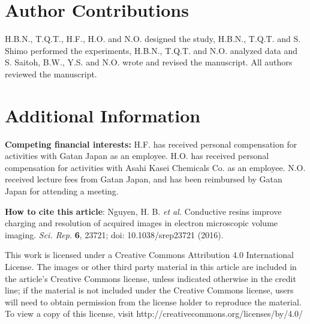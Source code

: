 \documentclass{article}
\begin{document}
\section*{Author Contributions}
H.B.N., T.Q.T., H.F., H.O. and N.O. designed the study, H.B.N., T.Q.T. and S. Shimo performed the experiments, H.B.N., T.Q.T. and N.O. analyzed data and S. Saitoh, B.W., Y.S. and N.O. wrote and revised the manuscript. All authors reviewed the manuscript.

\section*{Additional Information}
\noindent\textbf{Competing financial interests:} H.F. has received personal compensation for activities with Gatan Japan as an employee. H.O. has received personal compensation for activities with Asahi Kasei Chemicals Co. as an employee. N.O. received lecture fees from Gatan Japan, and has been reimbursed by Gatan Japan for attending a meeting.

\noindent\textbf{How to cite this article}: Nguyen, H. B. \emph{et al.} Conductive resins improve charging and resolution of acquired images in electron microscopic volume imaging. \emph{Sci. Rep.} \textbf{6}, 23721; doi: 10.1038/srep23721 (2016).

\noindent This work is licensed under a Creative Commons Attribution 4.0 International License. The images or other third party material in this article are included in the article’s Creative Commons license, unless indicated otherwise in the credit line; if the material is not included under the Creative Commons license, users will need to obtain permission from the license holder to reproduce the material. To view a copy of this license, visit http://creativecommons.org/licenses/by/4.0/
\end{document}
